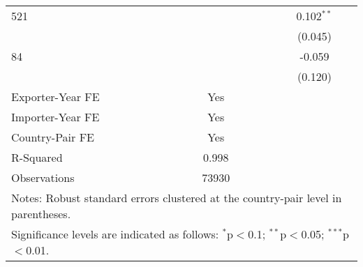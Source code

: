 \begin{center}
\begin{longtable}{lccc}
    521 &  &  & 0.102$^{\ast\ast}$ \\
    &  &  & (0.045) \\
    84  &  &  & -0.059 \\
    &  &  & (0.120) \\
    \hline
    Exporter-Year FE & Yes \\
    Importer-Year FE & Yes \\
    Country-Pair FE & Yes \\
    R-Squared & 0.998 \\
    Observations & 73930 \\
    \hline
    \multicolumn{4}{l}{\footnotesize{Notes: Robust standard errors clustered at the country-pair level in parentheses.}} \\
    \multicolumn{4}{l}{\footnotesize{Significance levels are indicated as follows: $^{\ast}$p$<$0.1; $^{\ast\ast}$p$<$0.05; $^{\ast\ast\ast}$p$<$0.01.}} \\
\end{longtable}
\end{center}


